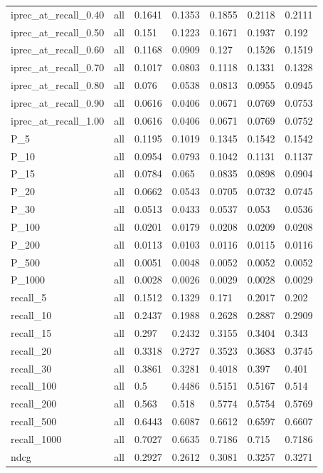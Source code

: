 \begin{table}[p]
\begin{tabular}{|l|l|l|l|l|l|l|}
        iprec\_at\_recall\_0.40 & all & 0.1641 & 0.1353 & 0.1855 & 0.2118 & 0.2111 \\ 
        iprec\_at\_recall\_0.50 & all & 0.151 & 0.1223 & 0.1671 & 0.1937 & 0.192 \\ 
        iprec\_at\_recall\_0.60 & all & 0.1168 & 0.0909 & 0.127 & 0.1526 & 0.1519 \\ 
        iprec\_at\_recall\_0.70 & all & 0.1017 & 0.0803 & 0.1118 & 0.1331 & 0.1328 \\ 
        iprec\_at\_recall\_0.80 & all & 0.076 & 0.0538 & 0.0813 & 0.0955 & 0.0945 \\ 
        iprec\_at\_recall\_0.90 & all & 0.0616 & 0.0406 & 0.0671 & 0.0769 & 0.0753 \\ 
        iprec\_at\_recall\_1.00 & all & 0.0616 & 0.0406 & 0.0671 & 0.0769 & 0.0752 \\ \midrule
        P\_5 & all & 0.1195 & 0.1019 & 0.1345 & 0.1542 & 0.1542 \\ 
        P\_10 & all & 0.0954 & 0.0793 & 0.1042 & 0.1131 & 0.1137 \\ 
        P\_15 & all & 0.0784 & 0.065 & 0.0835 & 0.0898 & 0.0904 \\ 
        P\_20 & all & 0.0662 & 0.0543 & 0.0705 & 0.0732 & 0.0745 \\ 
        P\_30 & all & 0.0513 & 0.0433 & 0.0537 & 0.053 & 0.0536 \\ 
        P\_100 & all & 0.0201 & 0.0179 & 0.0208 & 0.0209 & 0.0208 \\ 
        P\_200 & all & 0.0113 & 0.0103 & 0.0116 & 0.0115 & 0.0116 \\ 
        P\_500 & all & 0.0051 & 0.0048 & 0.0052 & 0.0052 & 0.0052 \\ 
        P\_1000 & all & 0.0028 & 0.0026 & 0.0029 & 0.0028 & 0.0029 \\ 
        recall\_5 & all & 0.1512 & 0.1329 & 0.171 & 0.2017 & 0.202 \\ 
        recall\_10 & all & 0.2437 & 0.1988 & 0.2628 & 0.2887 & 0.2909 \\ 
        recall\_15 & all & 0.297 & 0.2432 & 0.3155 & 0.3404 & 0.343 \\ 
        recall\_20 & all & 0.3318 & 0.2727 & 0.3523 & 0.3683 & 0.3745 \\ 
        recall\_30 & all & 0.3861 & 0.3281 & 0.4018 & 0.397 & 0.401 \\ 
        recall\_100 & all & 0.5 & 0.4486 & 0.5151 & 0.5167 & 0.514 \\ 
        recall\_200 & all & 0.563 & 0.518 & 0.5774 & 0.5754 & 0.5769 \\ 
        recall\_500 & all & 0.6443 & 0.6087 & 0.6612 & 0.6597 & 0.6607 \\ 
        recall\_1000 & all & 0.7027 & 0.6635 & 0.7186 & 0.715 & 0.7186 \\ \midrule
        ndcg & all & 0.2927 & 0.2612 & 0.3081 & 0.3257 & 0.3271 \\ \bottomrule
    \end{tabular}
\end{table}

